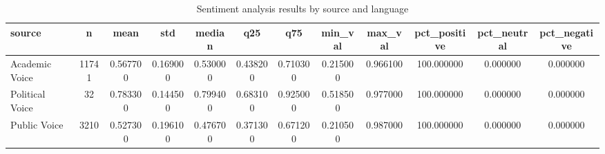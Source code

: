 \begin{table}
\caption{Sentiment analysis results by source and language}
\label{tab:table3_sentiment_summary}
\begin{tabular}{lccccccccccc}
\toprule
source & n & mean & std & median & q25 & q75 & min\_val & max\_val & pct\_positive & pct\_neutral & pct\_negative \\
\midrule
Academic Voice & 11741 & 0.567700 & 0.169000 & 0.530000 & 0.438200 & 0.710300 & 0.215000 & 0.966100 & 100.000000 & 0.000000 & 0.000000 \\
Political Voice & 32 & 0.783300 & 0.144500 & 0.799400 & 0.683100 & 0.925000 & 0.518500 & 0.977000 & 100.000000 & 0.000000 & 0.000000 \\
Public Voice & 3210 & 0.527300 & 0.196100 & 0.476700 & 0.371300 & 0.671200 & 0.210500 & 0.987000 & 100.000000 & 0.000000 & 0.000000 \\
\bottomrule
\end{tabular}
\end{table}
